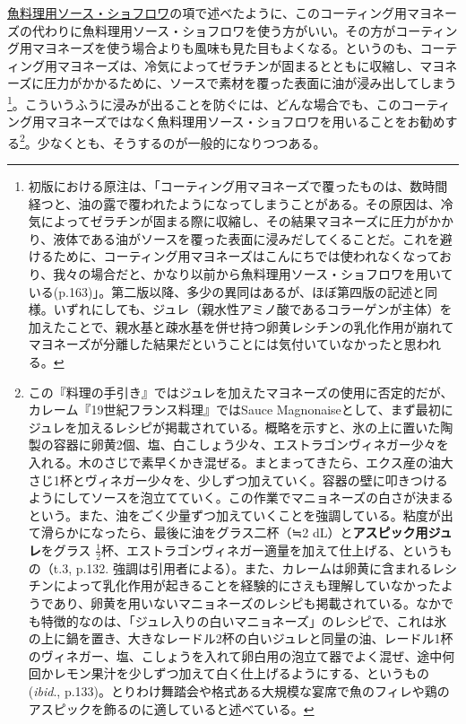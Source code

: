 \begin{recette}
\protect\hyperlink{sauce-chaud-froid-maigre}{魚料理用ソース・ショフロワ}の項で述べたように、このコーティング用マヨネーズの代わりに魚料理用ソース・ショフロワを使う方がいい。その方がコーティング用マヨネーズを使う場合よりも風味も見た目もよくなる。というのも、コーティング用マヨネーズは、冷気によってゼラチンが固まるとともに収縮し、マヨネーズに圧力がかかるために、ソースで素材を覆った表面に油が浸み出してしまう\footnote{初版における原注は、「コーティング用マヨネーズで覆ったものは、数時間経つと、油の露で覆われたようになってしまうことがある。その原因は、冷気によってゼラチンが固まる際に収縮し、その結果マヨネーズに圧力がかかり、液体である油がソースを覆った表面に浸みだしてくることだ。これを避けるために、コーティング用マヨネーズはこんにちでは使われなくなっており、我々の場合だと、かなり以前から魚料理用ソース・ショフロワを用いている(p.163)」。第二版以降、多少の異同はあるが、ほぼ第四版の記述と同様。いずれにしても、ジュレ（親水性アミノ酸であるコラーゲンが主体）を加えたことで、親水基と疎水基を併せ持つ卵黄レシチンの乳化作用が崩れてマヨネーズが分離した結果だということには気付いていなかったと思われる。}。こういうふうに浸みが出ることを防ぐには、どんな場合でも、このコーティング用マヨネーズではなく魚料理用ソース・ショフロワを用いることをお勧めする\footnote{この『料理の手引き』ではジュレを加えたマヨネーズの使用に否定的だが、カレーム『19世紀フランス料理』ではSauce
  Magnonaiseとして、まず最初にジュレを加えるレシピが掲載されている。概略を示すと、氷の上に置いた陶製の容器に卵黄2個、塩、白こしょう少々、エストラゴンヴィネガー少々を入れる。木のさじで素早くかき混ぜる。まとまってきたら、エクス産の油大さじ1杯とヴィネガー少々を、少しずつ加えていく。容器の壁に叩きつけるようにしてソースを泡立てていく。この作業でマニョネーズの白さが決まるという。また、油をごく少量ずつ加えていくことを強調している。粘度が出て滑らかになったら、最後に油をグラス二杯（≒2
  dL）と\textbf{アスピック用ジュレ}をグラス
  \(\frac{1}{2}\)杯、エストラゴンヴィネガー適量を加えて仕上げる、というもの（t.3,
  p.132.
  強調は引用者による）。また、カレームは卵黄に含まれるレシチンによって乳化作用が起きることを経験的にさえも理解していなかったようであり、卵黄を用いないマニョネーズのレシピも掲載されている。なかでも特徴的なのは、「ジュレ入りの白いマニョネーズ」のレシピで、これは氷の上に鍋を置き、大きなレードル2杯の白いジュレと同量の油、レードル1杯のヴィネガー、塩、こしょうを入れて卵白用の泡立て器でよく混ぜ、途中何回かレモン果汁を少しずつ加えて白く仕上げるようにする、というもの(\emph{ibid}.,
  p.133)。とりわけ舞踏会や格式ある大規模な宴席で魚のフィレや鶏のアスピックを飾るのに適していると述べている。}。少なくとも、そうするのが一般的になりつつある。


\end{recette}
